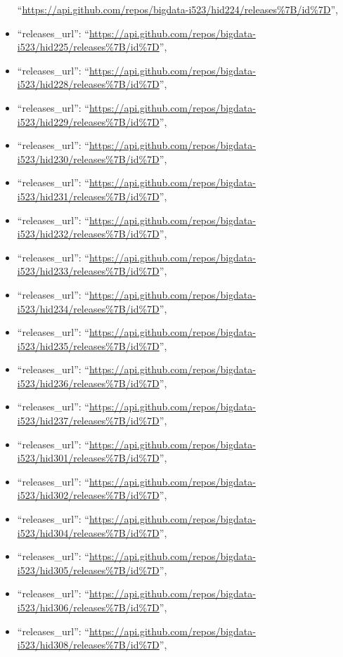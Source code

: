 \begin{itemize}
  ``\url{https://api.github.com/repos/bigdata-i523/hid224/releases\%7B/id\%7D}'',
\item
  ``releases\_url'':
  ``\url{https://api.github.com/repos/bigdata-i523/hid225/releases\%7B/id\%7D}'',
\item
  ``releases\_url'':
  ``\url{https://api.github.com/repos/bigdata-i523/hid228/releases\%7B/id\%7D}'',
\item
  ``releases\_url'':
  ``\url{https://api.github.com/repos/bigdata-i523/hid229/releases\%7B/id\%7D}'',
\item
  ``releases\_url'':
  ``\url{https://api.github.com/repos/bigdata-i523/hid230/releases\%7B/id\%7D}'',
\item
  ``releases\_url'':
  ``\url{https://api.github.com/repos/bigdata-i523/hid231/releases\%7B/id\%7D}'',
\item
  ``releases\_url'':
  ``\url{https://api.github.com/repos/bigdata-i523/hid232/releases\%7B/id\%7D}'',
\item
  ``releases\_url'':
  ``\url{https://api.github.com/repos/bigdata-i523/hid233/releases\%7B/id\%7D}'',
\item
  ``releases\_url'':
  ``\url{https://api.github.com/repos/bigdata-i523/hid234/releases\%7B/id\%7D}'',
\item
  ``releases\_url'':
  ``\url{https://api.github.com/repos/bigdata-i523/hid235/releases\%7B/id\%7D}'',
\item
  ``releases\_url'':
  ``\url{https://api.github.com/repos/bigdata-i523/hid236/releases\%7B/id\%7D}'',
\item
  ``releases\_url'':
  ``\url{https://api.github.com/repos/bigdata-i523/hid237/releases\%7B/id\%7D}'',
\item
  ``releases\_url'':
  ``\url{https://api.github.com/repos/bigdata-i523/hid301/releases\%7B/id\%7D}'',
\item
  ``releases\_url'':
  ``\url{https://api.github.com/repos/bigdata-i523/hid302/releases\%7B/id\%7D}'',
\item
  ``releases\_url'':
  ``\url{https://api.github.com/repos/bigdata-i523/hid304/releases\%7B/id\%7D}'',
\item
  ``releases\_url'':
  ``\url{https://api.github.com/repos/bigdata-i523/hid305/releases\%7B/id\%7D}'',
\item
  ``releases\_url'':
  ``\url{https://api.github.com/repos/bigdata-i523/hid306/releases\%7B/id\%7D}'',
\item
  ``releases\_url'':
  ``\url{https://api.github.com/repos/bigdata-i523/hid308/releases\%7B/id\%7D}'',

\end{itemize}
